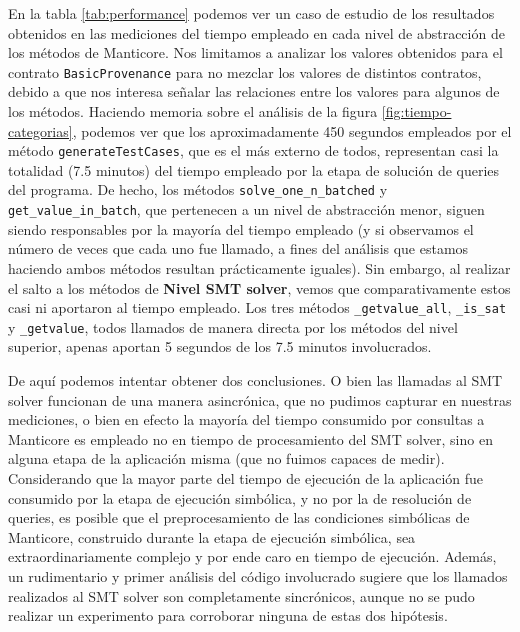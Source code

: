 En la tabla \ref{tab:performance} podemos ver un caso de estudio de los resultados obtenidos en las mediciones del tiempo empleado en cada nivel de abstracción de los métodos de Manticore.
Nos limitamos a analizar los valores obtenidos para el contrato \texttt{BasicProvenance} para no mezclar los valores de distintos contratos, debido a que nos interesa señalar las relaciones entre los valores para algunos de los métodos.
Haciendo memoria sobre el análisis de la figura \ref{fig:tiempo-categorias}, podemos ver que los aproximadamente 450 segundos empleados por el método \texttt{generateTestCases}, que es el más externo de todos, representan casi la totalidad (7.5 minutos) del tiempo empleado por la etapa de solución de queries del programa.
De hecho, los métodos \texttt{solve\_one\_n\_batched} y \texttt{get\_value\_in\_batch}, que pertenecen a un nivel de abstracción menor, siguen siendo responsables por la mayoría del tiempo empleado (y si observamos el número de veces que cada uno fue llamado, a fines del análisis que estamos haciendo ambos métodos resultan prácticamente iguales).
Sin embargo, al realizar el salto a los métodos de \textbf{Nivel SMT solver}, vemos que comparativamente estos casi ni aportaron al tiempo empleado.
Los tres métodos \texttt{\_getvalue\_all}, \texttt{\_is\_sat} y \texttt{\_getvalue}, todos llamados de manera directa por los métodos del nivel superior, apenas aportan 5 segundos de los 7.5 minutos involucrados.

De aquí podemos intentar obtener dos conclusiones.
O bien las llamadas al SMT solver funcionan de una manera asincrónica, que no pudimos capturar en nuestras mediciones, o bien en efecto la mayoría del tiempo consumido por consultas a Manticore es empleado no en tiempo de procesamiento del SMT solver, sino en alguna etapa de la aplicación misma (que no fuimos capaces de medir).
Considerando que la mayor parte del tiempo de ejecución de la aplicación fue consumido por la etapa de ejecución simbólica, y no por la de resolución de queries, es posible que el preprocesamiento de las condiciones simbólicas de Manticore, construido durante la etapa de ejecución simbólica, sea extraordinariamente complejo y por ende caro en tiempo de ejecución.
Además, un rudimentario y primer análisis del código involucrado sugiere que los llamados realizados al SMT solver son completamente sincrónicos, aunque no se pudo realizar un experimento para corroborar ninguna de estas dos hipótesis.



